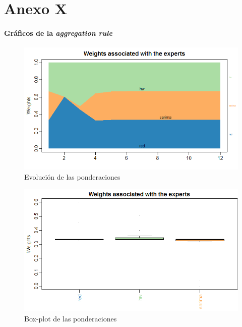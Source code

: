 \documentclass[12pt,a4paper,oneside]{article}
\begin{document}
\part*{Anexo X}

\subsection*{Gráficos de la \textit{aggregation rule}}
\vspace*{1\baselineskip}
\begin{figure} [h]
    \centering
    \centerline{\includegraphics[scale = 0.7]{Images/1.png}}
    \caption{Evolución de las ponderaciones}
    \label{red}
\end{figure}
\vspace*{3\baselineskip}
\vspace*{3\baselineskip}
\begin{figure} [h]
    \centering
    \centerline{\includegraphics[scale = 0.7]{Images/2.png}}
    \caption{Box-plot de las ponderaciones}
    \label{red}
\end{figure}
\end{document}
